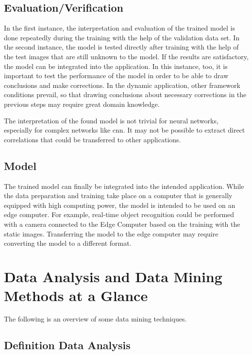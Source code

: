 \subsection{Evaluation/Verification}

In the first instance, the interpretation and evaluation of the trained model is done repeatedly during the training with the help of the validation data set. In the second instance, the model is tested directly after training with the help of the test images that are still unknown to the model. If the results are satisfactory, the model can be integrated into the application. In this instance, too, it is important to test the performance of the model in order to be able to draw conclusions and make corrections. In the dynamic application, other framework conditions prevail, so that drawing conclusions about necessary corrections in the previous steps may require great domain knowledge.

The interpretation of the found model is not trivial for neural networks, especially for complex networks like \ac{cnn}. It may not be possible to extract direct correlations that could be transferred to other applications.


\subsection{Model}

The trained model can finally be integrated into the intended application. While the data preparation and training take place on a computer that is generally equipped with high computing power, the model is intended to be used on an edge computer. For example, real-time object recognition could be performed with a camera connected to the Edge Computer based on the training with the static images. Transferring the model to the edge computer may require converting the model to a different format.


\section{Data Analysis and Data Mining Methods at a Glance}

The following is an overview of some data mining techniques.

\subsection{Definition Data Analysis}


